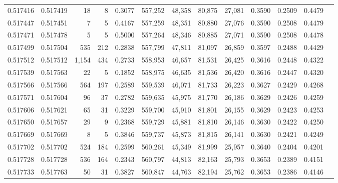 \begin{tabular}{rrrrrrrrrrrrr}
0.517416 & 0.517419 &    18 &     8 &                                     0.3077 & 557,252 &  48,358 &  80,875 &  27,081 & 0.3590 & 0.2509 & 0.4479 \\
0.517447 & 0.517451 &     7 &     5 &                                     0.4167 & 557,259 &  48,351 &  80,880 &  27,076 & 0.3590 & 0.2508 & 0.4479 \\
0.517471 & 0.517478 &     5 &     5 &                                     0.5000 & 557,264 &  48,346 &  80,885 &  27,071 & 0.3590 & 0.2508 & 0.4478 \\
0.517499 & 0.517504 &   535 &   212 &                                     0.2838 & 557,799 &  47,811 &  81,097 &  26,859 & 0.3597 & 0.2488 & 0.4429 \\
0.517512 & 0.517512 & 1,154 &   434 &                                     0.2733 & 558,953 &  46,657 &  81,531 &  26,425 & 0.3616 & 0.2448 & 0.4322 \\
0.517539 & 0.517563 &    22 &     5 &                                     0.1852 & 558,975 &  46,635 &  81,536 &  26,420 & 0.3616 & 0.2447 & 0.4320 \\
0.517566 & 0.517566 &   564 &   197 &                                     0.2589 & 559,539 &  46,071 &  81,733 &  26,223 & 0.3627 & 0.2429 & 0.4268 \\
0.517571 & 0.517604 &    96 &    37 &                                     0.2782 & 559,635 &  45,975 &  81,770 &  26,186 & 0.3629 & 0.2426 & 0.4259 \\
0.517606 & 0.517621 &    65 &    31 &                                     0.3229 & 559,700 &  45,910 &  81,801 &  26,155 & 0.3629 & 0.2423 & 0.4253 \\
0.517650 & 0.517657 &    29 &     9 &                                     0.2368 & 559,729 &  45,881 &  81,810 &  26,146 & 0.3630 & 0.2422 & 0.4250 \\
0.517669 & 0.517669 &     8 &     5 &                                     0.3846 & 559,737 &  45,873 &  81,815 &  26,141 & 0.3630 & 0.2421 & 0.4249 \\
0.517702 & 0.517702 &   524 &   184 &                                     0.2599 & 560,261 &  45,349 &  81,999 &  25,957 & 0.3640 & 0.2404 & 0.4201 \\
0.517728 & 0.517728 &   536 &   164 &                                     0.2343 & 560,797 &  44,813 &  82,163 &  25,793 & 0.3653 & 0.2389 & 0.4151 \\
0.517733 & 0.517763 &    50 &    31 &                                     0.3827 & 560,847 &  44,763 &  82,194 &  25,762 & 0.3653 & 0.2386 & 0.4146 \\

\end{tabular}
